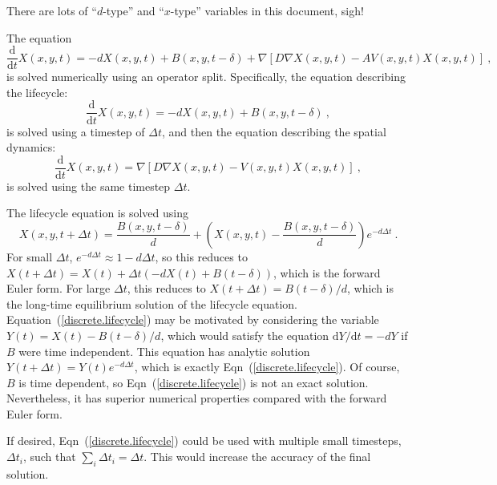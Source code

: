 \documentclass[11pt,a4paper]{article}
\begin{document}
There are lots of ``$d$-type'' and ``$x$-type'' variables in this document, sigh!

The equation
\begin{equation}
  \frac{\mathrm{d}}{\mathrm{d}t}X(x, y, t) = -dX(x, y, t) + B(x, y, t - \delta) + \nabla\left[D\nabla X(x, y, t) - AV(x, y, t)X(x, y, t)\right] \ ,
\end{equation}
is solved numerically using an operator split.  Specifically, the equation describing the lifecycle:
\begin{equation}
  \frac{\mathrm{d}}{\mathrm{d}t}X(x, y, t) = -dX(x, y, t) + B(x, y, t - \delta) \ ,
\end{equation}
is solved using a timestep of $\Delta t$, and then the equation describing the spatial dynamics:
\begin{equation}
  \frac{\mathrm{d}}{\mathrm{d}t}X(x, y, t) = \nabla\left[D\nabla X(x, y, t) - V(x, y, t)X(x, y, t)\right] \ ,
\end{equation}
is solved using the same timestep $\Delta t$.

The lifecycle equation is solved using
\begin{equation}
  X(x, y, t + \Delta t) = \frac{B(x, y, t - \delta)}{d} + \left(X(x, y, t) - \frac{B(x, y, t - \delta)}{d}\right)e^{ - d\Delta t} \ . \label{discrete.lifecycle}
\end{equation}
For small $\Delta t$, $e^{-d\Delta t} \approx 1 - d\Delta t$, so this reduces to $X(t + \Delta t) = X(t) + \Delta t (-dX(t) + B(t - \delta))$, which is the forward Euler form.  For large $\Delta t$, this reduces to $X(t + \Delta t) = B(t - \delta) / d$, which is the long-time equilibrium solution of the lifecycle equation.  Equation~(\ref{discrete.lifecycle}) may be motivated by considering the variable $Y(t) = X(t) - B(t - \delta)/d$, which would satisfy the equation $\mathrm{d}Y/\mathrm{d}t = -d Y$ if $B$ were time independent.  This equation has analytic solution $Y(t + \Delta t) = Y(t) e^{-d \Delta t}$, which is exactly Eqn~(\ref{discrete.lifecycle}).  Of course, $B$ is time dependent, so Eqn~(\ref{discrete.lifecycle}) is not an exact solution.  Nevertheless, it has superior numerical properties compared with the forward Euler form.

If desired, Eqn~(\ref{discrete.lifecycle}) could be used with multiple small timesteps, $\Delta t_{i}$, such that $\sum_{i}\Delta t_{i} = \Delta t$.  This would increase the accuracy of the final solution.
\end{document}
